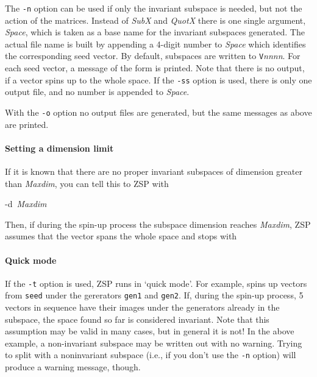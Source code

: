The {\tt -n} option can be used if only the invariant subspace
is needed, but not the action of the matrices. Instead of {\it SubX}
and {\it QuotX} there is one single argument, {\it Space}, which is
taken as a base name for the invariant subspaces generated. The actual
file name is built by appending a 4-digit number to {\it Space} which
identifies the corresponding seed vector. By default, subspaces are
written to {\tt V}{\it nnnn}. For each seed vector, a message of the
form
is printed. Note that there is no output, if a vector spins up to
the whole space. If the {\tt -ss} option is used, there is only one
output file, and no number is appended to {\it Space}.

With the {\tt -o} option no output files are generated, but the
same messages as above are printed.


\paragraph{Setting a dimension limit}
If it is known that there are no proper invariant subspaces of
dimension greater than {\it Maxdim}, you can tell this to ZSP with
\begin{list}{}{ \leftmargin 17mm }
\item{-d~{\it Maxdim}}
\end{list}
Then, if during the spin-up process the subspace dimension reaches
{\it Maxdim}, ZSP assumes that the vector spans the whole space and
stops with


\paragraph{Quick mode}
If the {\tt -t} option is used, ZSP runs in `quick mode'.
For example,
spins up vectors from {\tt seed} under the gererators {\tt gen1} and
{\tt gen2}. If, during the spin-up process, 5 vectors in sequence
have their images under the generators already in the subspace, the
space found so far is considered invariant. Note that this assumption
may be valid in many cases, but in general it is not! In the above
example, a non-invariant subspace may be written out with no warning.
Trying to split with a noninvariant subspace (i.e., if you don't use
the {\tt -n} option) will produce a warning message, though.



